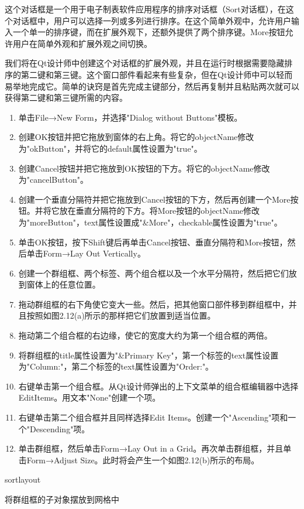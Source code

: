 \documentclass[11pt,oneside]{book}
\begin{document}
\begin{common-format}
这个对话框是一个用于电子制表软件应用程序的排序对话框（Sort对话框），在这个对话框中，用户可以选择一列或多列进行排序。在这个简单外观中，允许用户输入一个单一的排序键，而在扩展外观下，还额外提供了两个排序键。More按钮允许用户在简单外观和扩展外观之间切换。

我们将在Qt设计师中创建这个对话框的扩展外观，并且在运行时根据需要隐藏排序的第二键和第三键。这个窗口部件看起来有些复杂，但在Qt设计师中可以轻而易举地完成它。简单的诀窍是首先完成主键部分，然后再复制并且粘贴两次就可以获得第二键和第三键所需的内容。

\begin{enumerate}
\item 单击File→New Form，并选择"Dialog without Buttons"模板。
\item 创建OK按钮并把它拖放到窗体的右上角。将它的objectName修改为"okButton"，并将它的default属性设置为"true"。
\item 创建Cancel按钮并把它拖放到OK按钮的下方。将它的objectName修改为"cancelButton"。
\item 创建一个垂直分隔符并把它拖放到Cancel按钮的下方，然后再创建一个More按钮。并将它放在垂直分隔符的下方。将More按钮的objectName修改为"moreButton"，text属性设置成"\&{}More"，checkable属性设置为"true"。
\item 单击OK按钮，按下Shift键后再单击Cancel按钮、垂直分隔符和More按钮，然后单击Form→Lay Out Vertically。
\item 创建一个群组框、两个标签、两个组合框以及一个水平分隔符，然后把它们放到窗体上的任意位置。
\item 拖动群组框的右下角使它变大一些。然后，把其他窗口部件移到群组框中，并且按照如图2.12(a)所示的那样把它们放置到适当位置。
\item 拖动第二个组合框的右边缘，使它的宽度大约为第一个组合框的两倍。
\item 将群组框的title属性设置为"\&{}Primary Key"，第一个标签的text属性设置为"Column:"，第二个标签的text属性设置为"Order:"。
\item 右键单击第一个组合框。从Qt设计师弹出的上下文菜单的组合框编辑器中选择EditItems。用文本"None"创建一个项。
\item 右键单击第二个组合框并且同样选择Edit Items。创建一个"Ascending"项和一个"Descending"项。
\item 单击群组框，然后单击Form→Lay Out in a Grid。再次单击群组框，并且单击Form→Adjust Size。此时将会产生一个如图2.12(b)所示的布局。
\end{enumerate}

\begin{linefig}[0.8]{sortlayout}
\caption{将群组框的子对象摆放到网格中}
\label{fig:sortlayout}
\end{linefig}


\end{common-format}
\end{document}
